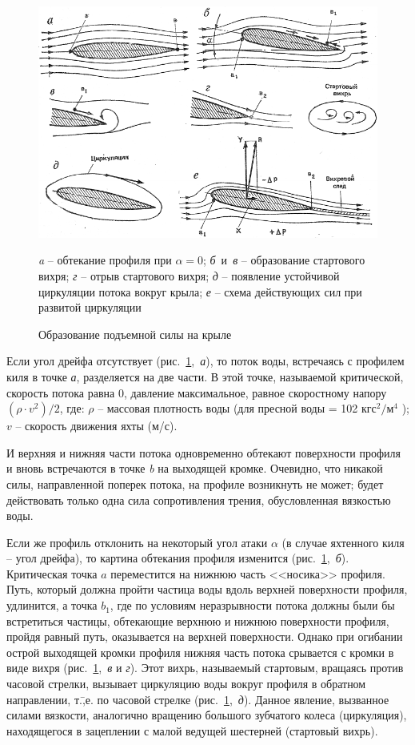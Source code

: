 \documentclass[a4paper, 12pt, twoside, final, book, russian, fittopage, cyremdash]{ncc}
\newcommand{\ris}[1]{\ref{fig:#1}}
\begin{document}
\begin{figure}[htb]
  \centering
  \includegraphics[scale=1.3]{0008P.pdf}
  \caption{Образование подъемной силы на крыле}
  \label{fig:8}
  \centering{}\small \textit{a} \--- обтекание профиля при $\alpha = 0$;
                     \textit{б}~и~\textit{в} \--- образование стартового вихря;
                     \textit{г} \--- отрыв стартового вихря;
                     \textit{д} \--- появление устойчивой циркуляции потока вокруг крыла;
                     \textit{е} \--- схема действующих сил при развитой циркуляции
\end{figure}

Если угол дрейфа отсутствует (рис.~\ris{8},~\textit{а}), то поток воды, встречаясь с профилем киля в точке \textit{а}, разделяется на две части. В этой точке, называемой критической, скорость потока равна 0, давление максимальное, равное скоростному напору $(\rho \cdot v^2) / 2$, где: $\rho$ \--- массовая плотность воды (для пресной воды = 102 $\text{кгс}^2 / \text{м}^4$ ); $v$ \--- скорость движения яхты (м/с). 

И верхняя и нижняя части потока одновременно обтекают поверхности профиля и вновь встречаются в точке \textit{b} на выходящей кромке. Очевидно, что никакой силы, направленной поперек потока, на профиле возникнуть не может; будет действовать только одна сила сопротивления трения, обусловленная вязкостью воды. 

Если же профиль отклонить на некоторый угол атаки $\alpha$ (в случае яхтенного киля \--- угол дрейфа), то картина обтекания профиля изменится (рис.~\ris{8},~\textit{б}). Критическая точка $a$ переместится на нижнюю часть <<носика>> профиля. Путь, который должна пройти частица воды вдоль верхней поверхности профиля, удлинится, а точка $b_1$, где по условиям неразрывности потока должны были бы встретиться частицы, обтекающие верхнюю и нижнюю поверхности профиля, пройдя равный путь, оказывается на верхней поверхности. Однако при огибании острой выходящей кромки профиля нижняя часть потока срывается с кромки в виде вихря (рис.~\ris{8},~\textit{в} и \textit{г}). Этот вихрь, называемый стартовым, вращаясь против часовой стрелки, вызывает циркуляцию воды вокруг профиля в обратном направлении, т.\=,е. по часовой стрелке (рис.~\ris{8},~\textit{д}). Данное явление, вызванное силами вязкости, аналогично вращению большого зубчатого колеса (циркуляция), находящегося в зацеплении с малой ведущей шестерней (стартовый вихрь). 
\end{document}
